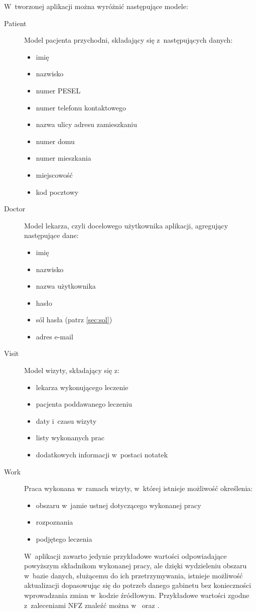 \documentclass[11pt]{aghdpl}
\begin{document}
W~tworzonej aplikacji można wyróżnić następujące modele:
\begin{description}
\item[Patient]
	Model pacjenta przychodni, składający się z~następujących danych:
	\begin{itemize}
		\item imię
		\item nazwisko
		\item numer PESEL
		\item numer telefonu kontaktowego
		\item nazwa ulicy adresu zamieszkaniu
		\item numer domu
		\item numer mieszkania
		\item miejscowość
		\item kod pocztowy
	\end{itemize}
\item[Doctor]
	Model lekarza, czyli docelowego użytkownika aplikacji, agregujący następujące dane:
	\begin{itemize}
		\item imię 
		\item nazwisko
		\item nazwa użytkownika
		\item hasło
		\item sól hasła (patrz \ref{sec:sol})
		\item adres e-mail
	\end{itemize}
\item[Visit]
	Model wizyty, składający się z:
	\begin{itemize}
		\item lekarza wykonującego leczenie
		\item pacjenta poddawanego leczeniu
		\item daty i~czasu wizyty
		\item listy wykonanych prac
		\item dodatkowych informacji w~postaci notatek
	\end{itemize}
\item[Work]
	Praca wykonana w~ramach wizyty, w~której istnieje możliwość określenia:
	\begin{itemize}
		\item obszaru w~jamie ustnej dotyczącego wykonanej pracy
		\item rozpoznania
		\item podjętego leczenia
	\end{itemize}
	W~aplikacji zawarto jedynie przykładowe wartości odpowiadające powyższym składnikom wykonanej pracy, ale dzięki wydzieleniu obszaru w~bazie danych, służącemu do ich przetrzymywania, istnieje możliwość aktualizacji dopasowując się do potrzeb danego gabinetu bez konieczności wprowadzania zmian w~kodzie źródłowym. Przykładowe wartości zgodne z~zaleceniami NFZ znaleźć można w~\cite{DzU13} oraz \cite{ICD9}.

\end{description}
\end{document}
